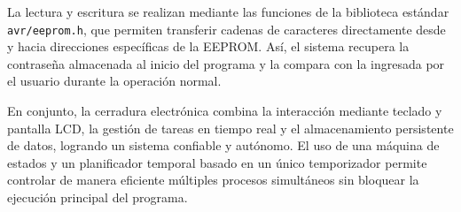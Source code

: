     La lectura y escritura se realizan mediante las funciones de la biblioteca estándar \texttt{avr/eeprom.h}, que permiten transferir cadenas de caracteres directamente desde y hacia direcciones específicas de la EEPROM. Así, el sistema recupera la contraseña almacenada al inicio del programa y la compara con la ingresada por el usuario durante la operación normal.

    \vspace{1em}

    En conjunto, la cerradura electrónica combina la interacción mediante teclado y pantalla LCD, la gestión de tareas en tiempo real y el almacenamiento persistente de datos, logrando un sistema confiable y autónomo. El uso de una máquina de estados y un planificador temporal basado en un único temporizador permite controlar de manera eficiente múltiples procesos simultáneos sin bloquear la ejecución principal del programa.

